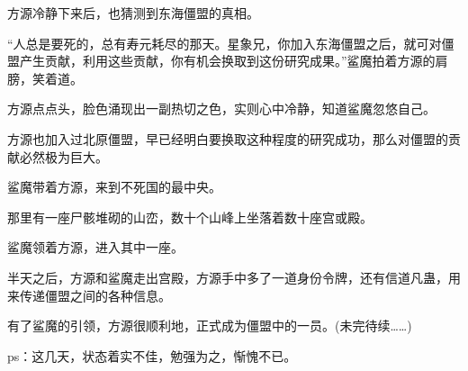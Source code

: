 \begin{this_body}
方源冷静下来后，也猜测到东海僵盟的真相。

“人总是要死的，总有寿元耗尽的那天。星象兄，你加入东海僵盟之后，就可对僵盟产生贡献，利用这些贡献，你有机会换取到这份研究成果。”鲨魔拍着方源的肩膀，笑着道。

方源点点头，脸色涌现出一副热切之色，实则心中冷静，知道鲨魔忽悠自己。

方源也加入过北原僵盟，早已经明白要换取这种程度的研究成功，那么对僵盟的贡献必然极为巨大。

鲨魔带着方源，来到不死国的最中央。

那里有一座尸骸堆砌的山峦，数十个山峰上坐落着数十座宫或殿。

鲨魔领着方源，进入其中一座。

半天之后，方源和鲨魔走出宫殿，方源手中多了一道身份令牌，还有信道凡蛊，用来传递僵盟之间的各种信息。

有了鲨魔的引领，方源很顺利地，正式成为僵盟中的一员。(未完待续……)

ps：这几天，状态着实不佳，勉强为之，惭愧不已。

\end{this_body}

